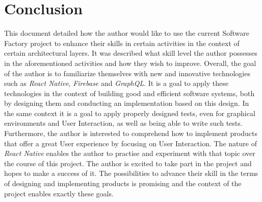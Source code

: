 \section{Conclusion}
\label{sec:conclusion}

This document detailed how the author would like to use the current Software Factory project to enhance their skills in certain activities in the context of certain architectural layers. It was described what skill level the author possesses in the aforementioned activities and how they wish to improve.
\newline
Overall, the goal of the author is to familiarize themselves with new and innovative technologies such as \textit{React Native}, \textit{Firebase} and \textit{GraphQL}. It is a goal to apply these technologies in the context of building good and efficient software systems, both by designing them and conducting an implementation based on this design. In the same context it is a goal to apply properly designed tests, even for graphical environments and User Interaction, as well as being able to write such tests.
\newline
Furthermore, the author is interested to comprehend how to implement products that offer a great User experience by focusing on User Interaction. The nature of \textit{React Native} enables the author to practise and experiment with that topic over the course of this project.
\newline
The author is excited to take part in the project and hopes to make a success of it. The possibilities to advance their skill in the terms of designing and implementing products is promising and the context of the project enables exactly these goals.